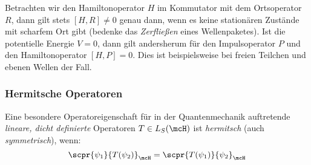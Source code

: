 \documentclass{subfiles}
\begin{document}
            Betrachten wir den Hamiltonoperator $H$ im Kommutator mit dem Ortsoperator $R$, dann gilt stets $[H,R]\neq 0$ genau dann, wenn es keine stationären Zustände mit scharfem Ort gibt (bedenke das \emph{Zerfließen} eines Wellenpaketes). Ist die potentielle Energie $V=0$, dann gilt andersherum für den Impulsoperator $P$ und den Hamiltonoperator $[H,P] = 0$. Dies ist beispielsweise bei freien Teilchen und ebenen Wellen der Fall. 

        \subsubsection*{Hermitsche Operatoren}
            Eine besondere Operatoreigenschaft für in der Quantenmechanik auftretende \emph{lineare, dicht definierte} Operatoren $T\in L_S(\mcH)$ ist \emph{hermitsch} (auch \emph{symmetrisch}), wenn:
            \[\scpr{\psi_1}{T(\psi_2)}_{\mcH} = \scpr{T(\psi_1)}{\psi_2}_{\mcH}\]
\end{document}
